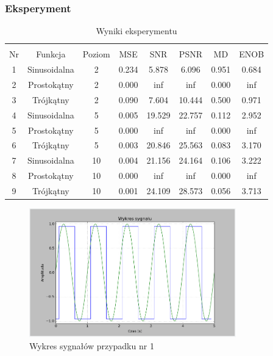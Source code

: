 \documentclass{article}
\begin{document}
    \subsubsection{Eksperyment}

    \begin{table}[h!]
        \centering
        \vspace{0.2cm}
        \begin{tabular}{|c|c|c|c|c|c|c|c|}
            \hline\hline\\[-0.4cm]
            Nr & Funkcja & Poziom & MSE & SNR & PSNR & MD & ENOB  \\
            \hline
            1 & Sinusoidalna & 2 & 0.234 & 5.878 & 6.096 & 0.951 & 0.684 \\
            \hline
            2 & Prostokątny & 2 & 0.000 & inf & inf & 0.000 & inf  \\
            \hline
            3 & Trójkątny & 2 & 0.090 & 7.604 & 10.444 & 0.500 & 0.971   \\
            \hline
            4 & Sinusoidalna & 5 & 0.005 & 19.529 & 22.757 & 0.112 & 2.952  \\
            \hline
            5 & Prostokątny & 5 & 0.000 & inf & inf & 0.000 & inf   \\
            \hline
            6 & Trójkątny & 5 & 0.003 & 20.846 & 25.563 & 0.083 & 3.170   \\
            \hline
            7 & Sinusoidalna & 10 & 0.004 & 21.156 & 24.164 & 0.106 & 3.222    \\
            \hline
            8 & Prostokątny & 10 & 0.000 & inf & inf & 0.000 & inf   \\
            \hline
            9 & Trójkątny & 10 & 0.001 & 24.109 & 28.573 & 0.056 & 3.713   \\
            \hline
        \end{tabular}
        \caption{Wyniki eksperymentu}
    \end{table}
    \FloatBarrier

    \begin{figure}[h!]
        \centering
        \includegraphics[width=0.8\textwidth]{img/1/quad_sin_2.png}
        \caption{Wykres sygnałów przypadku nr 1}
    \end{figure}
    \FloatBarrier
\end{document}
